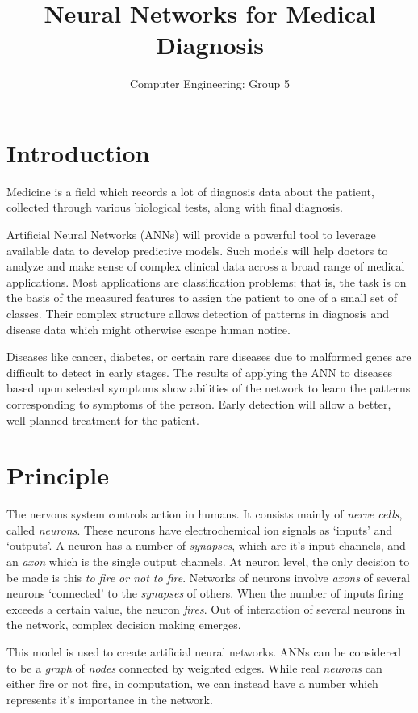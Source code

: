 \documentclass[11pt,a4paper]{article}
\author{Computer Engineering: Group 5}
\title{Neural Networks for Medical Diagnosis}
\date{}
\begin{document}
\maketitle

\section{Introduction}
Medicine is a field which records a lot of diagnosis data about the patient, collected through various biological tests, along with final diagnosis.

Artificial Neural Networks (ANNs) will provide a powerful tool to leverage available data to develop predictive models. Such models will help doctors to analyze and make sense of complex clinical data across a broad range of medical applications. Most applications are classification problems; that is, the task is on the basis of the measured features to assign the patient to one of a small set of classes. Their complex structure allows detection of patterns in diagnosis and disease data which might otherwise escape human notice.

Diseases like cancer, diabetes, or certain rare diseases due to malformed genes are difficult to detect in early stages. The results of applying the ANN to diseases based upon selected symptoms show abilities of the network to learn the patterns corresponding to symptoms of the person. Early detection will allow a better, well planned treatment for the patient.

\section{Principle}

The nervous system controls action in humans. It consists mainly of \emph{nerve cells}, called \emph{neurons}. These neurons have electrochemical ion signals as `inputs' and `outputs'. A neuron has a number of \emph{synapses}, which are it's input channels, and an \emph{axon} which is the single output channels. At neuron level, the only decision to be made is this \emph{to fire or not to fire}. Networks of neurons involve \emph{axons} of several neurons `connected' to the \emph{synapses} of others. When the number of inputs firing exceeds a certain value, the neuron \emph{fires}. Out of interaction of several neurons in the network, complex decision making emerges.

This model is used to create artificial neural networks. ANNs can be considered to be a \emph{graph} of \emph{nodes} connected by weighted edges. While real \emph{neurons} can either fire or not fire, in computation, we can instead have a number which represents it's importance in the network. 
\end{document}
